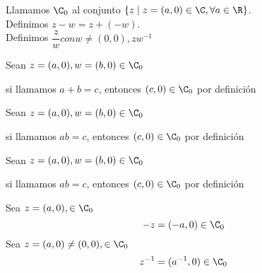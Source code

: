 \documentclass[10pt]{article}
\begin{document}

Llamamos $\C_0$ al conjunto $\left\{ z \mid z = (a,0) \in \C, \forall a \in \R \right\}$.\\
Definimos $z - w = z + (-w)$.\\
Definimos $\dfrac{z}{w} con w \neq (0,0), zw^{-1}$

\begin{prf}{}
	Sean $z = (a,0), w = (b,0) \in \C_0$\\


	si llamamos $a+b=c$, entonces $(c,0) \in \C_0$ por definición
\end{prf}

\begin{prf}{}
	Sean $z = (a,0), w = (b,0) \in \C_0$\\


	si llamamos $ab=c$, entonces $(c,0) \in \C_0$ por definición
\end{prf}

\begin{prf}{}
	Sean $z = (a,0), w = (b,0) \in \C_0$\\


	si llamamos $ab=c$, entonces $(c,0) \in \C_0$ por definición
\end{prf}

\begin{prf}{}
	Sea $z = (a,0), \in \C_0$
	$$-z = (-a,0) \in \C_0$$
	Sea $z = (a,0) \neq (0,0), \in \C_0$
	$$z^{-1} = (a^{-1},0) \in \C_0$$
\end{prf}
\end{document}
